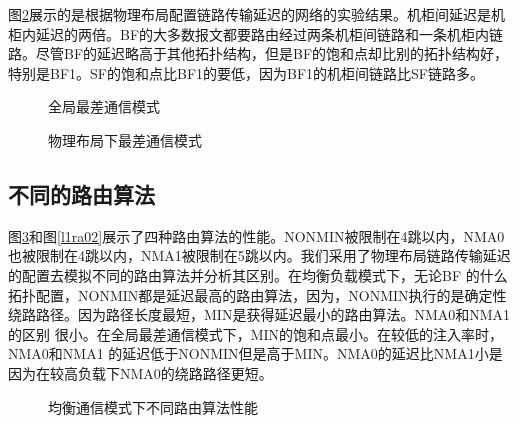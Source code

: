图\ref{layoutgla}展示的是根据物理布局配置链路传输延迟的网络的实验结果。机柜间延迟是机柜内延迟的两倍。BF的大多数报文都要路由经过两条机柜间链路和一条机柜内链路。尽管BF的延迟略高于其他拓扑结构，但是BF的饱和点却比别的拓扑结构好，特别是BF1。SF的饱和点比BF1的要低，因为BF1的机柜间链路比SF链路多。

\begin{figure}[t]
\setlength{\belowcaptionskip}{-.5cm}%
  \centering
 \begin{minipage}[t]{\textwidth}
   \centering
  \vspace{-.3cm}
  \caption{全局最差通信模式}
  \label{l1adv}
  \end{minipage}
 \end{figure}

 \begin{figure}[t]
 \setlength{\belowcaptionskip}{-.5cm}%
  \centering
 \begin{minipage}[t]{\textwidth}
   \centering
  \vspace{-.3cm}
  \caption{物理布局下最差通信模式}
  \label{layoutgla}
  \end{minipage}
  \end{figure}

  \subsection{不同的路由算法}

图\ref{l1ra01}和图\ref{l1ra02}展示了四种路由算法的性能。NONMIN被限制在4跳以内，NMA0也被限制在4跳以内，NMA1被限制在5跳以内。我们采用了物理布局链路传输延迟的配置去模拟不同的路由算法并分析其区别。在均衡负载模式下，无论BF 的什么拓扑配置，NONMIN都是延迟最高的路由算法，因为，NONMIN执行的是确定性绕路路径。因为路径长度最短，MIN是获得延迟最小的路由算法。NMA0和NMA1的区别
很小。在全局最差通信模式下，MIN的饱和点最小。在较低的注入率时，NMA0和NMA1
的延迟低于NONMIN但是高于MIN。NMA0的延迟比NMA1小是因为在较高负载下NMA0的绕路路径更短。

  \begin{figure}[t]
\setlength{\belowcaptionskip}{-.5cm}%
  \centering
 \begin{minipage}[t]{\textwidth}
   \centering
  \vspace{-.3cm}
  \caption{均衡通信模式下不同路由算法性能}
  \label{l1ra01}
  \end{minipage}
  \end{figure}

